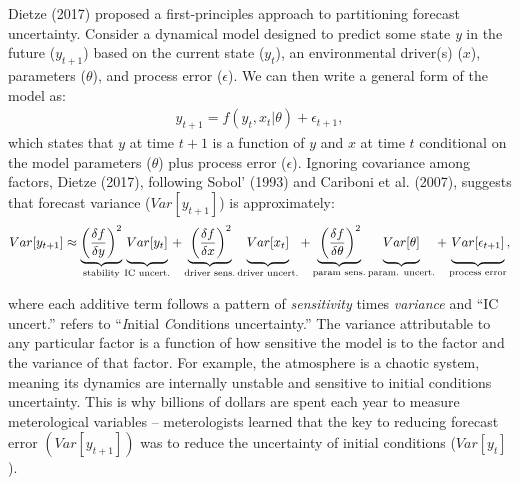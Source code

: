 \documentclass[12pt,]{article}
\begin{document}
Dietze (2017) proposed a first-principles approach to partitioning
forecast uncertainty. Consider a dynamical model designed to predict
some state \emph{y} in the future (\(y_{t+1}\)) based on the current
state (\(y_{t}\)), an environmental driver(s) (\(x\)), parameters
(\(\theta\)), and process error (\(\epsilon\)). We can then write a
general form of the model as: \begin{align}
y_{t+1} = f(y_t, x_t|\theta) + \epsilon_{t+1},
\end{align} which states that \(y\) at time \(t+1\) is a function of
\(y\) and \(x\) at time \(t\) conditional on the model parameters
(\(\theta\)) plus process error (\(\epsilon\)). Ignoring covariance
among factors, Dietze (2017), following Sobol' (1993) and Cariboni et
al. (2007), suggests that forecast variance (\(Var[y_{t+1}]\)) is
approximately: \begin{align}
Var[y_{t+1}] \approx \underbrace{\left(\frac{\delta f}{\delta y} \right)^2}_{\text{stability}} 
               \underbrace{\vphantom{ \left(\frac{\delta f}{\delta y} \right)^2 } Var[y_t]}_{\text{IC uncert.}} +
               \underbrace{\vphantom{ \left(\frac{\delta f}{\delta y} \right)^2 }\left(\frac{\delta f}{\delta x} \right)^2}_{\text{driver sens.}} 
               \underbrace{\vphantom{ \left(\frac{\delta f}{\delta y} \right)^2 } Var[x_t]}_{\text{driver uncert.}} +
               \underbrace{\vphantom{ \left(\frac{\delta f}{\delta y} \right)^2 }\left(\frac{\delta f}{\delta \theta} \right)^2}_{\text{param sens.}}
               \underbrace{\vphantom{ \left(\frac{\delta f}{\delta y} \right)^2 } Var[\theta]}_{\text{param. uncert.}} +
               \underbrace{\vphantom{ \left(\frac{\delta f}{\delta y} \right)^2 } Var[\epsilon_{t+1}]}_{\text{process error}},
\end{align}

where each additive term follows a pattern of \emph{sensitivity} times
\emph{variance} and ``IC uncert.'' refers to ``\emph{I}nitial
\emph{C}onditions uncertainty.'' The variance attributable to any
particular factor is a function of how sensitive the model is to the
factor and the variance of that factor. For example, the atmosphere is a
chaotic system, meaning its dynamics are internally unstable and
sensitive to initial conditions uncertainty. This is why billions of
dollars are spent each year to measure meterological variables --
meterologists learned that the key to reducing forecast error
\((Var[y_{t+1}])\) was to reduce the uncertainty of initial conditions
(\(Var[y_t]\)).
\end{document}

